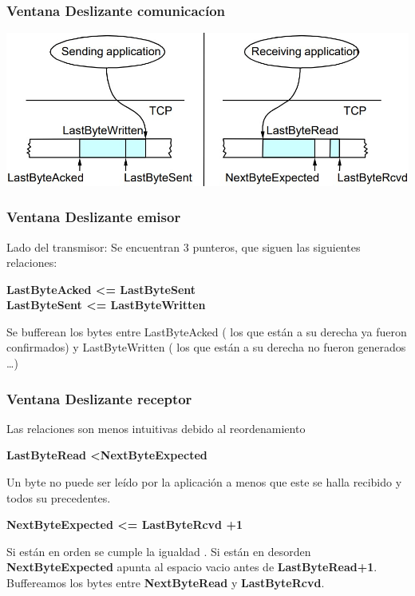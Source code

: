 \documentclass{beamer}
\begin{document}
\begin{frame}
	\frametitle{Ventana Deslizante comunicacíon}
	\includegraphics[width=\textwidth]{vdemisor}
\end{frame}
\begin{frame}
		\frametitle{Ventana Deslizante emisor}
	Lado del transmisor: Se encuentran 3 punteros, que siguen las siguientes relaciones:
	\begin{center}
\textbf{	LastByteAcked \textless= LastByteSent \\
	LastByteSent \textless= LastByteWritten}
	\end{center}
Se bufferean los bytes entre LastByteAcked ( los que están a su
derecha ya fueron confirmados) y LastByteWritten ( los que
están a su derecha no fueron generados …)
\end{frame}

\begin{frame}
		\frametitle{Ventana Deslizante receptor}
		Las relaciones son menos intuitivas debido al reordenamiento
		\begin{center}
			\textbf{LastByteRead \textless NextByteExpected}
		\end{center}
	Un byte no puede ser leído por la aplicación a menos que este se halla recibido y
	todos su
	precedentes.
	\begin{center}
	\textbf{	NextByteExpected \textless= LastByteRcvd +1}
	\end{center}
Si están en orden se cumple la igualdad . Si están en desorden
\textbf{NextByteExpected} apunta al espacio vacio antes de  \textbf{LastByteRead+1}.\\
Buffereamos los bytes entre \textbf{NextByteRead} y \textbf{LastByteRcvd}.
\end{frame}
 
\end{document}
